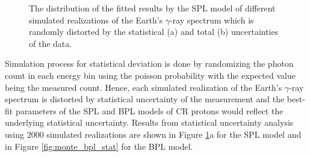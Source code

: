 \begin{figure}[h!]
    \centering
        \hfill
        \caption{
            The distribution of the fitted results by
            the SPL model of different simulated realizations of
            the Earth's $\gamma$-ray spectrum which is randomly
            distorted by the statistical (a) and total
            (b) uncertainties of the data.
        }
       \label{fig:monte_spl}
\end{figure}

Simulation process for statistical deviation is done by 
randomizing the photon count in each energy bin using
the poisson probability with the expected value being
the measured count.
Hence, each simulated realization of
the Earth's $\gamma$-ray spectrum
is distorted by statistical uncertainty of the measurement
and the best-fit parameters of the SPL and BPL models
of CR protons would reflect the underlying statistical uncertainty.
Results from statistical uncertainty analysis
using 2000 simulated realizations are shown
in Figure \ref{fig:monte_spl}a for the SPL model
and in Figure \ref{fig:monte_bpl_stat} for the BPL model.

